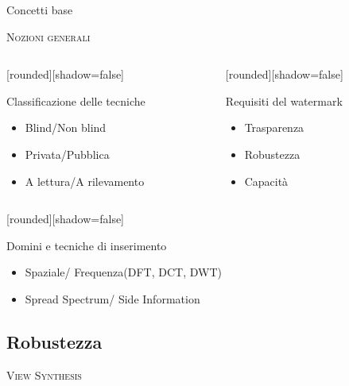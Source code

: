 \documentclass{beamer}
\begin{document}
\begin{section}{Concetti base}
\begin{frame}[t]{\textsc{Nozioni generali}}
\begin{columns}
\begin{column}{5cm}
\vspace{1em}
	[rounded][shadow=false]
\begin{block}{Classificazione delle tecniche}
\begin{itemize}
\item Blind/Non blind
\item Privata/Pubblica
\item A lettura/A rilevamento
\end{itemize}
\end{block}
\end{column}
\begin{column}{5cm}
\vspace{1em}
	[rounded][shadow=false]
\begin{block}{Requisiti del watermark}
\begin{itemize}
\item Trasparenza
\item Robustezza
\item Capacit\`{a}
\end{itemize}
\end{block}
\end{column}
\end{columns}
\vspace{1em}
[rounded][shadow=false]
\begin{block}{Domini e tecniche di inserimento}
\begin{itemize}
\item Spaziale/ Frequenza(DFT, DCT, DWT)
\item Spread Spectrum/ Side Information
\end{itemize}
\end{block}
\end{frame}

\subsection{Robustezza}
\begin{frame}[t]{\textsc{View Synthesis}}


\end{frame}
\end{section}
\end{document}
